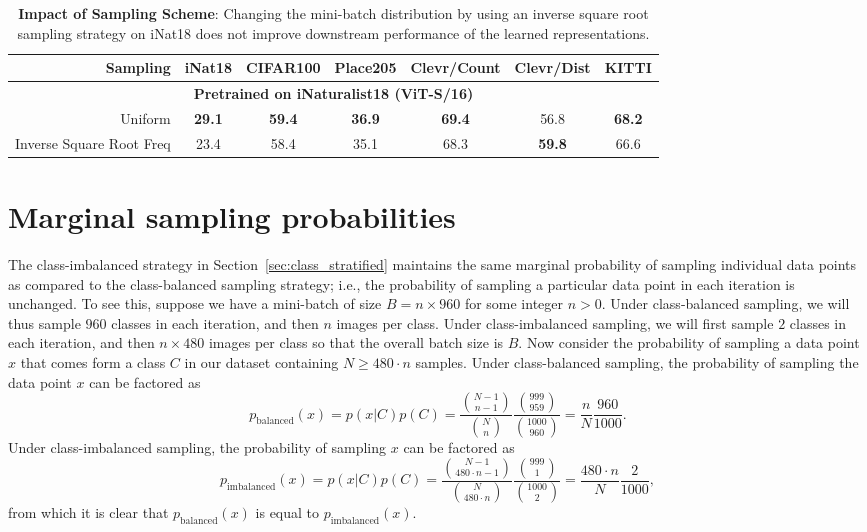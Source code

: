 \documentclass{article} %
\begin{document}
\begin{table}[h]
    \centering
    \footnotesize
    \caption{\textbf{Impact of Sampling Scheme}: Changing the mini-batch distribution by using an inverse square root sampling strategy on iNat18 does not improve downstream performance of the learned representations.}
    \label{tb:inatsampling}
    \begin{tabular}{r|cccc|cc}
        \toprule
        Sampling & iNat18 & CIFAR100 & Place205 & Clevr/Count & Clevr/Dist & KITTI\\
        \toprule\toprule
        \multicolumn{7}{c}{\scriptsize\bf Pretrained on iNaturalist18 (ViT-S/16)}\\[1mm]
        Uniform & \bf 29.1 & \bf 59.4 & \bf 36.9 & \bf 69.4 & 56.8 & \bf 68.2 \\
        Inverse Square Root Freq &   23.4 & 58.4 & 35.1 & 68.3 & \bf 59.8 & 66.6\\
        \bottomrule

    \end{tabular}
\end{table}

\section{Marginal sampling probabilities}
\label{app:marginalprob}
The {class-imbalanced} strategy in Section~\ref{sec:class_stratified} maintains the same marginal probability of sampling individual data points as compared to the {class-balanced} sampling strategy; i.e., the probability of sampling a particular data point in each iteration is unchanged.
To see this, suppose we have a mini-batch of size $B = n \times 960$ for some integer $n > 0$.
Under class-balanced sampling, we will thus sample $960$ classes in each iteration, and then $n$ images per class.
Under class-imbalanced sampling, we will first sample $2$ classes in each iteration, and then $n \times 480$ images per class so that the overall batch size is $B$.
Now consider the probability of sampling a data point $x$ that comes form a class $C$ in our dataset containing $N \geq 480 \cdot n$ samples.
Under class-balanced sampling, the probability of sampling the data point $x$ can be factored as
\[
    p_{\text{balanced}}(x) = p(x|C)p(C) = \frac{{N-1 \choose n-1}}{{N \choose  n}} \frac{{999 \choose 959}}{{1000 \choose 960}} = \frac{n}{N} \frac{960}{1000}.
\]
Under class-imbalanced sampling, the probability of sampling $x$ can be factored as
\[
    p_{\text{imbalanced}}(x) = p(x|C)p(C) =  \frac{{N-1 \choose 480 \cdot n-1}}{{N \choose 480 \cdot n}} \frac{{999 \choose 1}}{{1000 \choose 2}} = \frac{480\cdot n}{N} \frac{2}{1000},
\]
from which it is clear that $p_{\text{balanced}}(x)$ is equal to $p_{\text{imbalanced}}(x)$.
\end{document}
